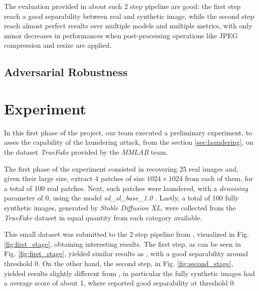 \documentclass[conference]{IEEEtran} %
\begin{document}
        The evaluation provided in \cite{mandelli2022detecting} about such 2 step pipeline are good: the first step reach a good separability between real and synthetic image, while the second step reach almost perfect results over multiple models and multiple metrics, with only minor decreases in performances when post-processing operations like JPEG compression and resize are applied.
    \subsection{Adversarial Robustness}
\section{Experiment}
    In this first phase of the project, our team executed a preliminary experiment, to asses the capability of the laundering attack, from the section \ref{sec:laundering}, on the dataset \textit{TrueFake} provided by the \textit{MMLAB} team.

    The first phase of the experiment consisted in recovering 25 real images and, given their large size, extract 4 patches of size $1024\times1024$ from each of them, for a total of 100 real patches. Next, such patches were laundered, with a \textit{denoising} parameter of 0, using the model \textit{sd\_xl\_base\_1.0} \cite{sdxl_base_1_0}. Lastly, a total of 100 fully synthetic images, generated by \textit{Stable Diffusion XL}, were collected from the \textit{TrueFake} dataset in equal quantity from each category available.

    This small dataset was submitted to the 2 step pipeline from \cite{mandelli2024synthetic}, visualized in Fig. \ref{fig:first_stage}, obtaining interesting results. The first step, as can be seen in Fig. \ref{fig:first_stage},  yielded similar results as \cite{mandelli2024synthetic}, with a good separability around threshold 0. On the other hand, the second step, in Fig. \ref{fig:second_stage}, yielded results slightly different from \cite{mandelli2024synthetic}, in particular the fully synthetic images had a average score of about 1, where \cite{mandelli2024synthetic} reported good separability at threshold 0. 
\end{document}
